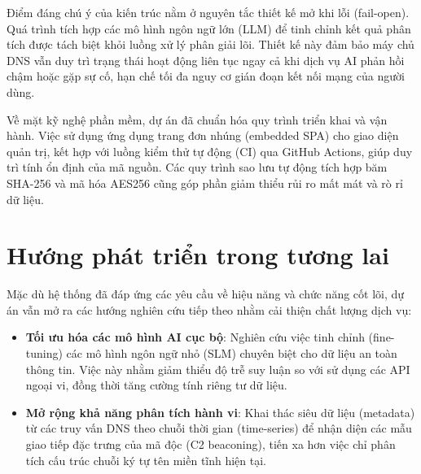 \documentclass[13pt,a4paper]{extreport}
\begin{document}
Điểm đáng chú ý của kiến trúc nằm ở nguyên tắc thiết kế mở khi lỗi (fail-open). Quá trình tích hợp các mô hình ngôn ngữ lớn (LLM) để tinh chỉnh kết quả phân tích được tách biệt khỏi luồng xử lý phân giải lõi. Thiết kế này đảm bảo máy chủ DNS vẫn duy trì trạng thái hoạt động liên tục ngay cả khi dịch vụ AI phản hồi chậm hoặc gặp sự cố, hạn chế tối đa nguy cơ gián đoạn kết nối mạng của người dùng.

Về mặt kỹ nghệ phần mềm, dự án đã chuẩn hóa quy trình triển khai và vận hành. Việc sử dụng ứng dụng trang đơn nhúng (embedded SPA) cho giao diện quản trị, kết hợp với luồng kiểm thử tự động (CI) qua GitHub Actions, giúp duy trì tính ổn định của mã nguồn. Các quy trình sao lưu tự động tích hợp băm SHA-256 và mã hóa AES256 cũng góp phần giảm thiểu rủi ro mất mát và rò rỉ dữ liệu.

\section*{Hướng phát triển trong tương lai}
Mặc dù hệ thống đã đáp ứng các yêu cầu về hiệu năng và chức năng cốt lõi, dự án vẫn mở ra các hướng nghiên cứu tiếp theo nhằm cải thiện chất lượng dịch vụ:

\begin{itemize}
    \item \textbf{Tối ưu hóa các mô hình AI cục bộ}: Nghiên cứu việc tinh chỉnh (fine-tuning) các mô hình ngôn ngữ nhỏ (SLM) chuyên biệt cho dữ liệu an toàn thông tin. Việc này nhằm giảm thiểu độ trễ suy luận so với sử dụng các API ngoại vi, đồng thời tăng cường tính riêng tư dữ liệu.
    \item \textbf{Mở rộng khả năng phân tích hành vi}: Khai thác siêu dữ liệu (metadata) từ các truy vấn DNS theo chuỗi thời gian (time-series) để nhận diện các mẫu giao tiếp đặc trưng của mã độc (C2 beaconing), tiến xa hơn việc chỉ phân tích cấu trúc chuỗi ký tự tên miền tĩnh hiện tại.
\end{itemize}
\clearpage


\renewcommand{\bibname}{\centering \textbf{\fontsize{16pt}{18pt}\selectfont TÀI LIỆU THAM KHẢO}}

\nocite{*}
\printbibliography
\end{document}
